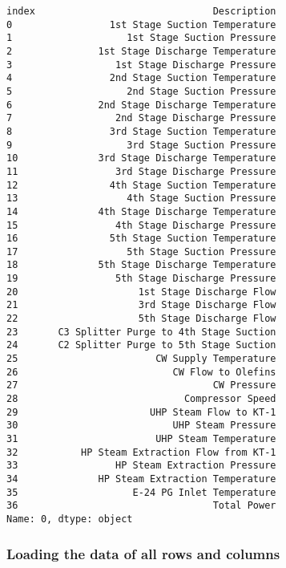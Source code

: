 \documentclass[11pt]{article}
\makeatletter
\newcommand{\boxspacing}{\kern\kvtcb@left@rule\kern\kvtcb@boxsep}
\newcommand{\prompt}[4]{
        \ttfamily\llap{{\color{#2}[#3]:\hspace{3pt}#4}}\vspace{-\baselineskip}
    }
\makeatother
\begin{document}
            \begin{tcolorbox}[breakable, size=fbox, boxrule=.5pt, pad at break*=1mm, opacityfill=0]
\prompt{Out}{outcolor}{8}{\boxspacing}
\begin{Verbatim}[commandchars=\\\{\}]
index                               Description
0                 1st Stage Suction Temperature
1                    1st Stage Suction Pressure
2               1st Stage Discharge Temperature
3                  1st Stage Discharge Pressure
4                 2nd Stage Suction Temperature
5                    2nd Stage Suction Pressure
6               2nd Stage Discharge Temperature
7                  2nd Stage Discharge Pressure
8                 3rd Stage Suction Temperature
9                    3rd Stage Suction Pressure
10              3rd Stage Discharge Temperature
11                 3rd Stage Discharge Pressure
12                4th Stage Suction Temperature
13                   4th Stage Suction Pressure
14              4th Stage Discharge Temperature
15                 4th Stage Discharge Pressure
16                5th Stage Suction Temperature
17                   5th Stage Suction Pressure
18              5th Stage Discharge Temperature
19                 5th Stage Discharge Pressure
20                     1st Stage Discharge Flow
21                     3rd Stage Discharge Flow
22                     5th Stage Discharge Flow
23       C3 Splitter Purge to 4th Stage Suction
24       C2 Splitter Purge to 5th Stage Suction
25                        CW Supply Temperature
26                           CW Flow to Olefins
27                                  CW Pressure
28                             Compressor Speed
29                       UHP Steam Flow to KT-1
30                           UHP Steam Pressure
31                        UHP Steam Temperature
32           HP Steam Extraction Flow from KT-1
33                 HP Steam Extraction Pressure
34              HP Steam Extraction Temperature
35                    E-24 PG Inlet Temperature
36                                  Total Power
Name: 0, dtype: object
\end{Verbatim}
\end{tcolorbox}
        
    \hypertarget{loading-the-data-of-all-rows-and-columns}{%
\subsubsection{Loading the data of all rows and
columns}\label{loading-the-data-of-all-rows-and-columns}}
\end{document}
